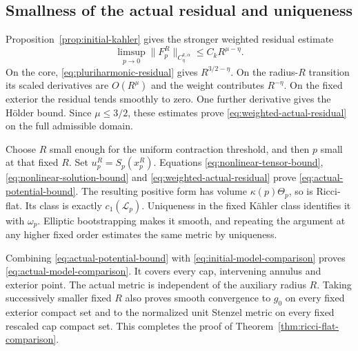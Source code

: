 \subsection{Smallness of the actual residual and uniqueness}

Proposition~\ref{prop:initial-kahler} gives
the stronger weighted residual estimate
\begin{equation}\label{eq:weighted-actual-residual}
 \limsup_{p\to0}\|F_p^R\|_{C^{k,\alpha}_\eta}
       \le C_kR^{\mu-\eta}.
\end{equation}
On the core, \eqref{eq:pluriharmonic-residual}
gives $R^{3/2-\eta}$. On the radius-$R$
transition its scaled derivatives are
$O(R^\mu)$ and the weight contributes
$R^{-\eta}$. On the fixed exterior the
residual tends smoothly to zero.
One further derivative gives the Hölder
bound. Since $\mu\le3/2$, these estimates
prove \eqref{eq:weighted-actual-residual}
on the full admissible domain.

Choose $R$ small enough for the uniform
contraction threshold, and then $p$ small
at that fixed $R$. Set $u_p^R=S_p(x_p^R)$.
Equations \eqref{eq:nonlinear-tensor-bound},
\eqref{eq:nonlinear-solution-bound} and
\eqref{eq:weighted-actual-residual} prove
\eqref{eq:actual-potential-bound}. The resulting
positive form has volume $\kappa(p)\Theta_p$,
so is Ricci-flat. Its class is exactly
$c_1(\mathcal L_p)$. Uniqueness in the fixed
Kähler class identifies it with $\omega_p$.
Elliptic bootstrapping makes it smooth, and
repeating the argument at any higher fixed
order estimates the same metric by uniqueness.

Combining \eqref{eq:actual-potential-bound}
with \eqref{eq:initial-model-comparison}
proves \eqref{eq:actual-model-comparison}.
It covers every cap, intervening annulus
and exterior point. The actual metric is
independent of the auxiliary radius $R$.
Taking successively smaller fixed $R$
also proves smooth convergence to $g_0$
on every fixed exterior compact set and
to the normalized unit Stenzel metric on
every fixed rescaled cap compact set.
This completes the proof of
Theorem~\ref{thm:ricci-flat-comparison}.
